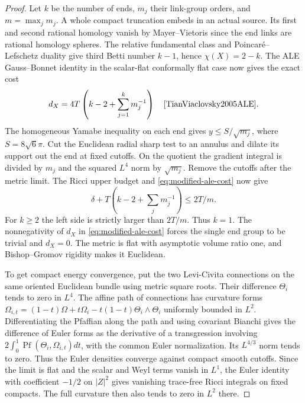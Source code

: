 \begin{proof}
Let \(k\) be the number of ends, \(m_j\) their link-group orders,
and \(m=\max_j m_j\). A whole compact truncation embeds in an
actual source. Its first and second rational homology vanish by
Mayer--Vietoris since the end links are rational homology spheres.
The relative fundamental class and Poincar\'e--Lefschetz duality
give third Betti number \(k-1\), hence \(\chi(X)=2-k\).
The ALE Gauss--Bonnet identity in the scalar-flat conformally
flat case now gives the exact cost
\begin{equation}\label{eq:modified-ale-cost}
 d_X=4T\left(k-2+\sum_{j=1}^k m_j^{-1}\right)
 \quad\cite[Section~7, (7.4)]{TianViaclovsky2005ALE}.
\end{equation}
The homogeneous Yamabe inequality on each end gives
\(y\le S/\sqrt{m_j}\), where \(S=8\sqrt6\pi\). Cut the Euclidean
radial sharp test to an annulus and dilate its support out the
end at fixed cutoffs. On the quotient the gradient
integral is divided by \(m_j\) and the squared \(L^4\) norm by
\(\sqrt{m_j}\). Remove the cutoffs after the metric limit. The
Ricci upper budget and \eqref{eq:modified-ale-cost} now give
\[
 \delta+T\left(k-2+\sum_j m_j^{-1}\right)\le 2T/m.
\]
For \(k\ge2\) the left side is strictly larger than \(2T/m\).
Thus \(k=1\). The nonnegativity of \(d_X\) in
\eqref{eq:modified-ale-cost} forces the single end group to be
trivial and \(d_X=0\). The metric is flat with asymptotic volume
ratio one, and Bishop--Gromov rigidity makes it Euclidean.

To get compact energy convergence, put the two Levi-Civita
connections on the same oriented Euclidean bundle using metric
square roots. Their difference \(\Theta_i\) tends to zero in
\(L^4\). The affine path of connections has curvature forms
\(\Omega_{i,t}=(1-t)\Omega+t\Omega_i-t(1-t)\Theta_i\wedge\Theta_i\)
uniformly bounded in \(L^2\). Differentiating the Pfaffian along
the path and using covariant Bianchi gives the difference of
Euler forms as the derivative of a transgression involving
\(2\int_0^1\operatorname{Pf}(\Theta_i,\Omega_{i,t})dt\), with
the common Euler normalization. Its \(L^{4/3}\) norm tends to
zero. Thus the Euler densities converge against compact smooth
cutoffs. Since the limit is flat and the scalar and Weyl
terms vanish in \(L^1\), the Euler identity with coefficient
\(-1/2\) on \(|Z|^2\) gives vanishing trace-free Ricci integrals
on fixed compacts. The full curvature then also tends to zero
in \(L^2\) there.


\end{proof}
